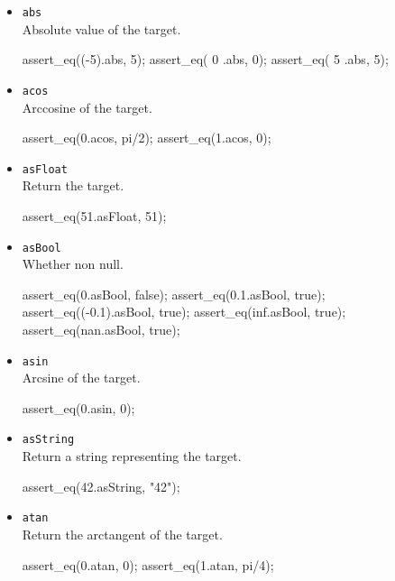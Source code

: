 \begin{itemize}
\item \lstinline|abs|\\
  Absolute value of the target.
\begin{urbiscript}[firstnumber=last]
assert_eq((-5).abs, 5);
assert_eq(  0 .abs, 0);
assert_eq(  5 .abs, 5);
\end{urbiscript}

\item \lstinline|acos|\\
  Arccosine of the target.
\begin{urbiscript}[firstnumber=last]
assert_eq(0.acos, pi/2);
assert_eq(1.acos, 0);
\end{urbiscript}

\item \lstinline|asFloat|\\
  Return the target.
\begin{urbiscript}[firstnumber=last]
assert_eq(51.asFloat, 51);
\end{urbiscript}

\item \lstinline|asBool|\\
  Whether non null.
\begin{urbiscript}[firstnumber=last]
assert_eq(0.asBool, false);
assert_eq(0.1.asBool, true);
assert_eq((-0.1).asBool, true);
assert_eq(inf.asBool, true);
assert_eq(nan.asBool, true);
\end{urbiscript}

\item \lstinline|asin|\\
  Arcsine of the target.
\begin{urbiscript}[firstnumber=last]
assert_eq(0.asin, 0);
\end{urbiscript}

\item \lstinline|asString|\\
  Return a string representing the target.
\begin{urbiscript}[firstnumber=last]
assert_eq(42.asString, "42");
\end{urbiscript}

\item \lstinline|atan|\\
  Return the arctangent of the target.
\begin{urbiscript}[firstnumber=last]
assert_eq(0.atan, 0);
assert_eq(1.atan, pi/4);
\end{urbiscript}


\end{itemize}
